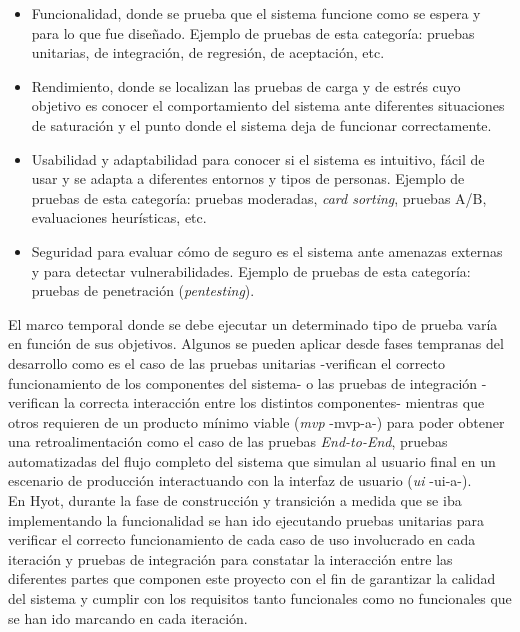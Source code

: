\documentclass[12pt,a4paper, twoside]{report}
\begin{document}
	\begin{itemize}
		\item Funcionalidad, donde se prueba que el sistema funcione como se espera y para lo que fue diseñado. Ejemplo de pruebas de esta categoría: pruebas unitarias, de integración, de regresión, de aceptación, etc.
		\item Rendimiento, donde se localizan las pruebas de carga y de estrés cuyo objetivo es conocer el comportamiento del sistema ante diferentes situaciones de saturación y el punto donde el sistema deja de funcionar correctamente.
		\item Usabilidad y adaptabilidad para conocer si el sistema es intuitivo, fácil de usar y se adapta a diferentes entornos y tipos de personas. Ejemplo de pruebas de esta categoría: pruebas moderadas, \textit{card sorting}, pruebas A/B, evaluaciones heurísticas, etc.
		\item Seguridad para evaluar cómo de seguro es el sistema ante amenazas externas y para detectar vulnerabilidades. Ejemplo de pruebas de esta categoría: pruebas de penetración (\textit{pentesting}).
	\end{itemize}
	
	El marco temporal donde se debe ejecutar un determinado tipo de prueba varía en función de sus objetivos. Algunos se pueden aplicar desde fases tempranas del desarrollo como es el caso de las pruebas unitarias -verifican el correcto funcionamiento de los componentes del sistema- o las pruebas de integración -verifican la correcta interacción entre los distintos componentes- mientras que otros requieren de un producto mínimo viable (\textit{\gls{mvp}} -\gls{mvp-a}-) para poder obtener una retroalimentación como el caso de las pruebas \textit{End-to-End}, pruebas automatizadas del flujo completo del sistema que simulan al usuario final en un escenario de producción interactuando con la interfaz de usuario (\textit{\gls{ui}} -\gls{ui-a}-). \\

	En Hyot, durante la fase de construcción y transición a medida que se iba implementando la funcionalidad se han ido ejecutando pruebas unitarias para verificar el correcto funcionamiento de cada caso de uso involucrado en cada iteración y pruebas de integración para constatar la interacción entre las diferentes partes que componen este proyecto con el fin de garantizar la calidad del sistema y cumplir con los requisitos tanto funcionales como no funcionales que se han ido marcando en cada iteración. \\
	
\end{document}
